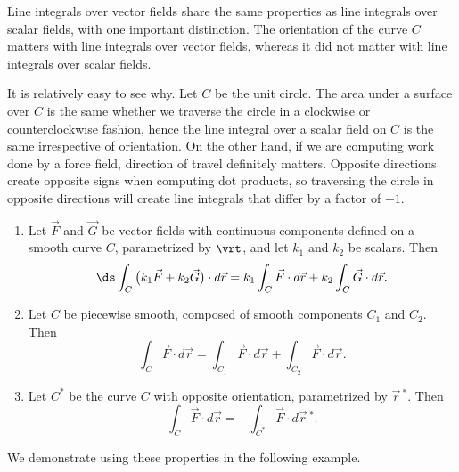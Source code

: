Line integrals over vector fields share the same properties as line integrals over scalar fields, with one important distinction. The orientation of the curve $C$ matters with line integrals over vector fields, whereas it did not matter with line integrals over scalar fields.

It is relatively easy to see why. Let $C$ be the unit circle. The area under a surface over $C$ is the same whether we traverse the circle in a clockwise or counterclockwise fashion, hence the line integral over a scalar field on $C$ is the same irrespective of orientation. On the other hand, if we are computing work done by a force field, direction of travel definitely matters. Opposite directions create opposite signs when computing dot products, so traversing the circle in opposite directions will create line integrals that differ by a factor of $-1$. 

{
\begin{enumerate}
	\item	Let $\vec F$ and $\vec G$ be  vector fields with continuous components defined on a smooth curve $C$, parametrized by $\vrt$, and let $k_1$ and $k_2$ be scalars. Then
	$$\ds \int_C\big(k_1\vec F+k_2\vec G\big)\cdot d\vec r = k_1\int_C\vec F\cdot d\vec r +k_2\int_C\vec G\cdot d\vec r.$$
	\item Let $C$ be piecewise smooth, composed of smooth components $C_1$ and $C_2$. Then
	$$\int_C\vec F\cdot d\vec r = \int_{C_1}\vec F\cdot d\vec r + \int_{C_2}\vec F\cdot d\vec r.$$
	\item	Let $C^*$ be the curve $C$ with opposite orientation, parametrized by $\vec r\,^*$. Then
	$$\int_C\vec F\cdot d\vec r = -\int_{C^*}\vec F\cdot d\vec r\,^*.$$
	\end{enumerate}
}

We demonstrate using these properties in the following example.\\

